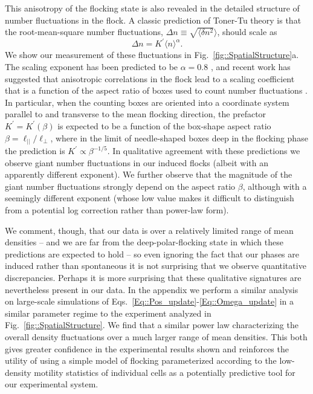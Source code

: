 \documentclass[reprint,unsortedaddress,amsmath,amssymb,aps,pre]{revtex4-2}
\begin{document}
This anisotropy of the flocking state is also revealed in the detailed structure of number fluctuations in the flock. A classic prediction of Toner-Tu theory is that the root-mean-square number fluctuations,  $\Delta{n}\equiv\sqrt{\langle{\delta{n}^2}}\rangle$, should scale as \begin{equation}\label{eq:tonerScaling}
\Delta{n}=K^{\prime}\langle{n}\rangle^{\alpha}.
\end{equation}
We show our measurement of these fluctuations in Fig.~\ref{fig::SpatialStructure}a. The scaling exponent has been predicted to be $\alpha=0.8$ \cite{1998_Toner}, and recent work has suggested that anisotropic correlations in the flock lead to a scaling coefficient that is a function of the aspect ratio of boxes used to count number fluctuations \cite{toner2019giant}. In particular, when the counting boxes are oriented into a coordinate system parallel to and transverse to the mean flocking direction, the prefactor  $K^{\prime}=K^{\prime}(\beta)$ is expected to be a function of the box-shape aspect ratio $\beta=\ell_{||}/\ell_{\perp}$, where in the limit of needle-shaped boxes deep in the flocking phase the prediction is  $K^{\prime}\propto\beta^{-1/5}$. In qualitative agreement with these predictions we observe giant number fluctuations in our induced flocks (albeit with an apparently different exponent). We further observe that the magnitude of the giant number fluctuations strongly depend on the aspect ratio $\beta$, although with a seemingly different exponent (whose low value makes it difficult to distinguish from a potential log correction rather than power-law form). 

We comment, though, that our data is over a relatively limited range of mean densities -- and we are far from the deep-polar-flocking state in which these predictions are expected to hold -- so even ignoring the fact that our phases are induced rather than spontaneous it is not surprising that we observe quantitative discrepancies. Perhaps it is more surprising that these qualitative signatures are nevertheless present in our data. In the appendix we perform a similar analysis on large-scale simulations of Eqs.~\ref{Eq::Pos_update}-\ref{Eq::Omega_update} in a similar parameter regime to the experiment analyzed in Fig.~\ref{fig::SpatialStructure}. We find that a similar power law characterizing the overall density fluctuations over a much larger range of mean densities. This both gives greater confidence in the experimental results shown and reinforces the utility of using a simple model of flocking parameterized according to the low-density motility statistics of individual cells as a potentially predictive tool for our experimental system. 
\end{document}

